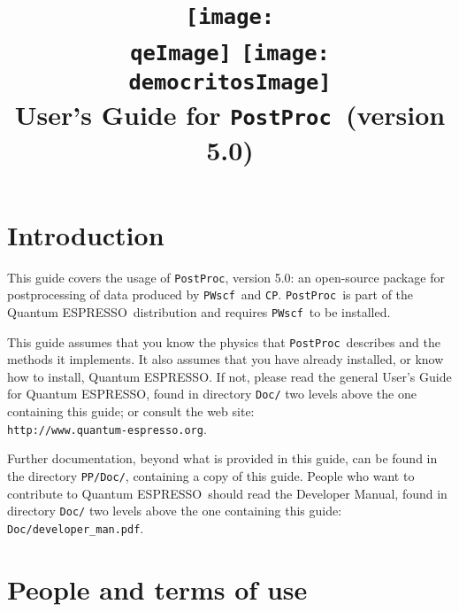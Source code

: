 \documentclass[12pt,a4paper]{article}
\def\version{5.0}
\def\qe{{\sc Quantum ESPRESSO}}
\def\PWscf{\texttt{PWscf}}
\def\CP{\texttt{CP}}
\def\PostProc{\texttt{PostProc}}
\begin{document}
 
\author{}
\date{}

\def\qeImage{../../Doc/quantum_espresso.pdf}
\def\democritosImage{../../Doc/democritos.pdf}

\begin{htmlonly}
\def\qeImage{quantum_espresso.png}
\def\democritosImage{democritos.png}
\end{htmlonly}

\title{
  \texttt{[image: \\qeImage]} \hskip 2cm
  \texttt{[image: \\democritosImage]}\\
  \vskip 1cm
  \Huge User's Guide for \PostProc\
  \Large (version \version)
}


\maketitle

\tableofcontents

\section{Introduction}

This guide covers the usage of \PostProc, version \version: 
an open-source package for postprocessing of data produced by
\PWscf\ and \CP. \PostProc\ is part of the \qe\ distribution 
and requires \PWscf\ to be installed.

This guide assumes that you know the physics 
that \PostProc\ describes and the methods it implements.
It also assumes  that you have already installed,
or know how to install, \qe. If not, please read
the general User's Guide for \qe, found in 
directory \texttt{Doc/} two levels above the 
one containing this guide; or consult the web site:\\
\texttt{http://www.quantum-espresso.org}.

Further documentation, beyond what is provided 
in this guide, can be found in the directory
\texttt{PP/Doc/}, containing a copy of this guide.
People who want to contribute to \qe\ should read the 
Developer Manual, found in directory \texttt{Doc/} two levels
above the one containing this guide: \texttt{Doc/developer\_man.pdf}.

\section{People and terms of use}
\end{document}
